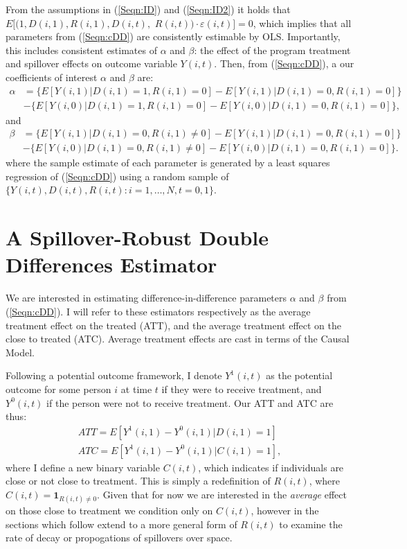\documentclass[12pt]{article}
\begin{document}
\begin{spacing}{1.3}
From the assumptions in (\ref{Seqn:ID}) and (\ref{Seqn:ID2}) it holds that 
$E[(1,D(i,1),R(i,1),D(i,t),$
$R(i,t))\cdot\varepsilon(i,t)]=0$, which 
implies that all parameters from (\ref{Seqn:cDD}) are consistently estimable 
by OLS.  Importantly, this includes consistent estimates of $\alpha$ and 
$\beta$: the effect of the program treatment and spillover effects on 
outcome variable $Y(i,t)$.  Then, from (\ref{Seqn:cDD}), a our coefficients 
of interest $\alpha$ and $\beta$ are:
\begin{equation}
\nonumber
\label{Seqn:DDa}
\begin{split}
\alpha&=\{E[Y(i,1)|D(i,1)=1,R(i,1)=0]-E[Y(i,1)|D(i,1)=0,R(i,1)=0]\} \\
      &-\{E[Y(i,0)|D(i,1)=1,R(i,1)=0]-E[Y(i,0)|D(i,1)=0,R(i,1)=0]\}, 
\end{split}
\end{equation}
and 
\begin{equation}
\nonumber
\label{Seqn:DDb}
\begin{split}
\beta&=\{E[Y(i,1)|D(i,1)=0,R(i,1)\neq 0]-E[Y(i,1)|D(i,1)=0,R(i,1)=0]\} \\
      &-\{E[Y(i,0)|D(i,1)=0,R(i,1)\neq 0]-E[Y(i,0)|D(i,1)=0,R(i,1)=0]\}. 
\end{split}
\end{equation}
where the sample estimate of each parameter is generated by a least squares
regression of (\ref{Seqn:cDD}) using a random sample of 
$\{Y(i,t), D(i,t), R(i,t): i=1, \ldots, N, t=0, 1\}$.

\section{A Spillover-Robust Double Differences Estimator}
\label{Sscn:estim}
We are interested in estimating difference-in-difference parameters $\alpha$ and 
$\beta$ from (\ref{Seqn:cDD}).  I will refer to these estimators respectively
as the average treatment effect on the treated (ATT), and the average treatment
effect on the close to treated (ATC).  Average treatment effects are cast in 
terms of the \citet{Rubin1974} Causal Model.

Following a potential outcome framework, I denote $Y^1(i,t)$ as the potential
outcome for some person $i$ at time $t$ if they were to receive treatment, and
$Y^0(i,t)$ if the person were not to receive treatment.  Our ATT and ATC are
thus:
\begin{eqnarray}
\label{Seqn:estimATT}
ATT=E[Y^1(i,1)-Y^0(i,1)|D(i,1)=1]\  \\
\label{Seqn:estimATC}
ATC=E[Y^1(i,1)-Y^0(i,1)|C(i,1)=1],
\end{eqnarray}
where I define a new binary variable $C(i,t)$, which indicates if individuals 
are close or not close to treatment.  This is simply a redefinition of $R(i,t)$,
where $C(i,t)=\mathbf{1}_{R(i,t)\neq 0}$.  Given that for now we are interested
in the \emph{average} effect on those close to treatment we condition only on
$C(i,t)$, however in the sections which follow extend to a more general form of
$R(i,t)$ to examine the rate of decay or propogations of spillovers over space.


\end{spacing}
\end{document}
